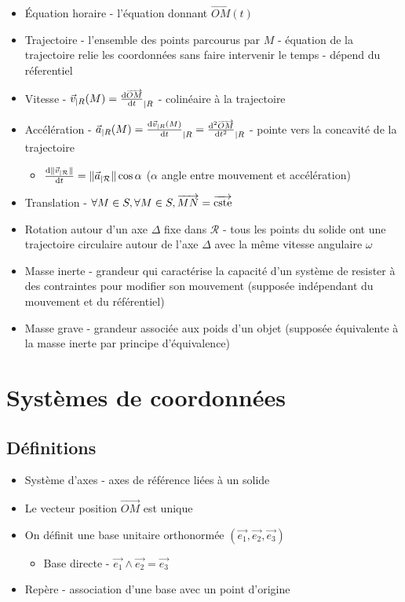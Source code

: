 \documentclass[openany]{book}
\begin{document}
\begin{itemize}
\begin{itemize}
    \end{itemize}
    \item Équation horaire - l'équation donnant $ \overrightarrow{OM}(t) $
    \item Trajectoire - l'ensemble des points parcourus par $M$ - équation de la trajectoire relie les coordonnées sans faire intervenir le temps - dépend du réferentiel
    \item Vitesse - $ \vec{v}_{|R}(M) = \frac{\text{d} \overrightarrow{OM}}{\text{d}t}_{|R} $ - colinéaire à la trajectoire
    \item Accélération - $ \vec{a}_{|R}(M) = \frac{\text{d} \vec{v}_{|R}(M)}{\text{d}t}_{|R} = \frac{\text{d}^2 \overrightarrow{OM}}{\text{d}t^2}_{|R} $ - pointe vers la concavité de la trajectoire
    \begin{itemize}
        \item $ \frac{\text{d} \| \vec{v}_{|\mathcal{R}} \|}{\text{d}t} = \| \vec{a}_{|\mathcal{R}} \| \cos \alpha $ ($\alpha$ angle entre mouvement et accélération)
    \end{itemize}
    \item Translation - $\forall M \in S, \forall M \in S, \overrightarrow{MN} = \overrightarrow{\text{cste}}$
    \item Rotation autour d'un axe $\Delta$ fixe dans $\mathcal{R}$ - tous les points du solide ont une trajectoire circulaire autour de l'axe $\Delta$ avec la même vitesse angulaire $\omega$
    \item Masse inerte - grandeur qui caractérise la capacité d'un système de resister à des contraintes pour modifier son mouvement (supposée indépendant du mouvement et du référentiel)
    \item Masse grave - grandeur associée aux poids d'un objet (supposée équivalente à la masse inerte par principe d'équivalence)
\end{itemize}

\section{Systèmes de coordonnées}
\subsection{Définitions}
\begin{itemize}
    \item Système d'axes - axes de référence liées à un solide
    \item Le vecteur position $ \overrightarrow{OM} $ est unique
    \item On définit une base unitaire orthonormée $ (\vec{e_1}, \vec{e_2}, \vec{e_3}) $
    \begin{itemize}
        \item Base directe - $ \vec{e_1} \wedge \vec{e_2} = \vec{e_3} $
    \end{itemize}
    \item Repère - association d'une base avec un point d'origine
\end{itemize}
\end{document}

